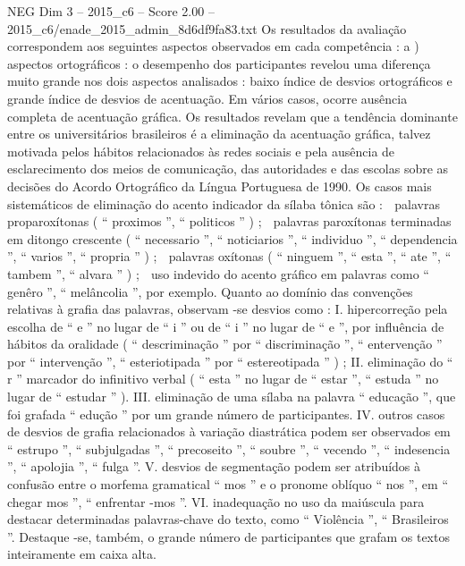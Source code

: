 \begin{textsample}{NEG Dim 3 – 2015\_c6 – Score 2.00 – 2015\_c6/enade\_2015\_admin\_8d6df9fa83.txt}
Os resultados da avaliação correspondem aos seguintes aspectos observados em cada competência : a ) aspectos ortográficos : o desempenho dos participantes revelou uma diferença muito grande nos dois aspectos analisados : baixo índice de desvios ortográficos e grande índice de desvios de acentuação.
Em vários casos, ocorre ausência completa de acentuação gráfica.
Os resultados revelam que a tendência dominante entre os universitários brasileiros é a eliminação da acentuação gráfica, talvez motivada pelos hábitos relacionados às redes sociais e pela ausência de esclarecimento dos meios de comunicação, das autoridades e das escolas sobre as decisões do Acordo Ortográfico da Língua Portuguesa de 1990.
Os casos mais sistemáticos de eliminação do acento indicador da sílaba tônica são :  palavras proparoxítonas ( “ proximos ”, “ politicos ” ) ;  palavras paroxítonas terminadas em ditongo crescente ( “ necessario ”, “ noticiarios ”, “ individuo ”, “ dependencia ”, “ varios ”, “ propria ” ) ;  palavras oxítonas ( “ ninguem ”, “ esta ”, “ ate ”, “ tambem ”, “ alvara ” ) ;  uso indevido do acento gráfico em palavras como “ genêro ”, “ melâncolia ”, por exemplo.
Quanto ao domínio das convenções relativas à grafia das palavras, observam -se desvios como : I. hipercorreção pela escolha de “ e ” no lugar de “ i ” ou de “ i ” no lugar de “ e ”, por influência de hábitos da oralidade ( “ descriminação ” por “ discriminação ”, “ entervenção ” por “ intervenção ”, “ esteriotipada ” por “ estereotipada ” ) ; II. eliminação do “ r ” marcador do infinitivo verbal ( “ esta ” no lugar de “ estar ”, “ estuda ” no lugar de “ estudar ” ).
III. eliminação de uma sílaba na palavra “ educação ”, que foi grafada “ edução ” por um grande número de participantes.
IV. outros casos de desvios de grafia relacionados à variação diastrática podem ser observados em “ estrupo ”, “ subjulgadas ”, “ precoseito ”, “ soubre ”, “ vecendo ”, “ indesencia ”, “ apolojia ”, “ fulga ”.
V. desvios de segmentação podem ser atribuídos à confusão entre o morfema gramatical “ mos ” e o pronome oblíquo “ nos ”, em “ chegar mos ”, “ enfrentar -mos ”.
VI. inadequação no uso da maiúscula para destacar determinadas palavras-chave do texto, como “ Violência ”, “ Brasileiros ”.
Destaque -se, também, o grande número de participantes que grafam os textos inteiramente em caixa alta.

\end{textsample}

